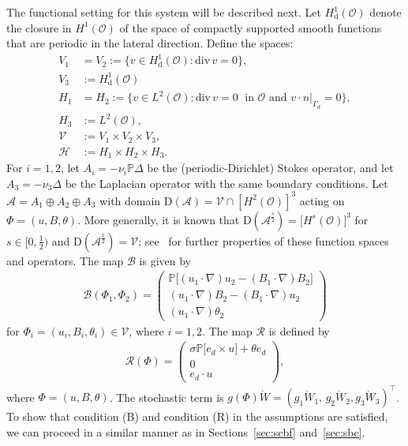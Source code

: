 \documentclass[11pt, reqno]{amsart}
\theoremstyle{definition}
\numberwithin{equation}{section}
\newcommand{\bb}{\mathbb}
\newcommand{\divg}{\mathrm{div}\,}
\begin{document}
The functional setting for this system will be described next. Let $H^1_{\mathrm{d}}(\mathscr{O})$ denote the closure in $H^1(\mathscr{O})$ of the space of compactly supported smooth functions that are periodic in the lateral direction. Define the spaces:
\begin{align*}
    V_1 &= V_2 := \{v\in H^1_\mathrm{d}(\mathscr{O}): \divg v=0\},
    \\
    V_3 &:= H^1_\mathrm{d}(\mathscr{O})
    \\
    H_1 &= H_2 := \{v\in L^2(\mathscr{O}): \divg v=0 \;\text{ in $\mathscr{O}$ and } \left. v\cdot n \right|_{\Gamma_d}= 0\},
    \\
    H_3 &:= L^2(\mathscr{O}),
    \\
    \mathcal{V}&:= V_1\times V_2 \times V_3,
    \\
    \mathcal{H}&:= H_1\times H_2 \times H_3.
\end{align*}
For $i=1,2$, let $A_i= -\nu_i \bb{P}\Delta$ be the (periodic-Dirichlet) Stokes operator, and let $A_3= -\nu_3 \Delta$ be the Laplacian operator with the same boundary conditions. Let $\mathcal{A}= A_1 \oplus A_2 \oplus A_3$ with domain $\mathrm{D}(\mathcal{A})= \mathcal{V} \cap \left[H^2(\mathscr{O})\right]^3$ acting on $\Phi=(u,B,\theta)$. More generally, it is known that $\mathrm{D}(\mathcal{A}^{\frac{s}{2}})= \big[ H^s(\mathscr{O})\big]^3$ for $s\in [0,\frac12)$ and $\mathrm{D}(\mathcal{A}^{\frac12})= \mathcal{V}$; see~\cite{IftRau01} for further properties of these function spaces and operators. The map $\mathcal{B}$ is given by
\begin{align*}
    \mathcal{B}(\Phi_1,\Phi_2)= 
    \begin{pmatrix} \bb{P}\big[(u_1\cdot\nabla)u_2- (B_1\cdot\nabla)B_2 \big] \\[0.5ex] (u_1\cdot\nabla) B_2- (B_1\cdot\nabla)u_2 \\[0.5ex]
    (u_1\cdot\nabla)\theta_2\end{pmatrix}
\end{align*}
for $\Phi_i=(u_i,B_i,\theta_i)\in \mathcal{V}$, where $i=1,2$. The map $\mathcal{R}$ is defined by
\begin{align*}
    \mathcal{R}(\Phi)= 
    \begin{pmatrix} \sigma \bb{P}\big[e_d\times u\big] + \theta e_d\\[0.5ex] 0 \\[0.5ex] e_d\cdot u \end{pmatrix},
\end{align*}
where $\Phi=(u,B,\theta)$. The stochastic term is $g(\Phi)\dot{W}= (g_1\dot{W}_1,\, g_2\dot{W}_2, g_3\dot{W}_3)^\top$. To show that condition (B) and condition (R) in the assumptions are satisfied, we can proceed in a similar manner as in Sections~\ref{sec:scbf} and~\ref{sec:sbc}.
\end{document}
